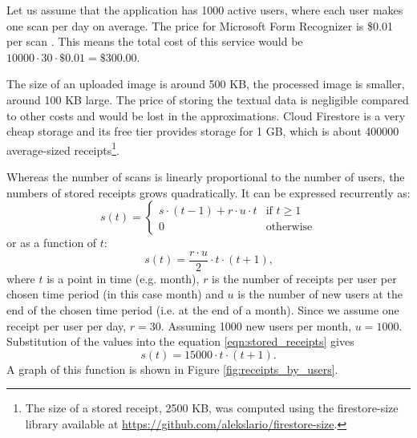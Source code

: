 \documentclass[
  digital, %
  table,   %
  oneside, %
  lof,     %
  lot,     %
]{fithesis3}
\begin{document}
Let us assume that the application has \num{1000} active users, where each user makes one scan per day on average.
The price for Microsoft Form Recognizer is \$0.01 per scan \cite{FormRecognizerPricing}. This means the total cost of this service would be $\num{10000} \cdot 30 \cdot \$0.01 = \$300.00$.

The size of an uploaded image is around 500 KB, the processed image is smaller, around 100 KB large. The price of storing the textual data is negligible compared to other costs and would be lost in the approximations. Cloud Firestore is a very cheap storage \cite{CloudFirestorePricing} and its free tier provides storage for 1 GB, which is about \num{400000} average-sized receipts\footnote{The size of a stored receipt, \num{2500} KB, was computed using the firestore-size library available at \url{https://github.com/alekslario/firestore-size}.}.

Whereas the number of scans is linearly proportional to the number of users, the numbers of stored receipts grows quadratically. It can be expressed recurrently as: 
\begin{equation}
    s(t) = \begin{cases}
        s \cdot (t-1) + r \cdot u \cdot t & \text{if }t\geq1\\
        0 & \text{otherwise}
    \end{cases}
\end{equation}
or as a function of $t$:
\begin{equation}
\label{eqn:stored_receipts}
s(t) = \frac{r \cdot u}{2} \cdot t \cdot (t + 1)\text{,}
\end{equation}
where $t$ is a point in time (e.g. month), $r$ is the number of receipts per user per chosen time period (in this case month) and $u$ is the number of new users at the end of the chosen time period (i.e. at the end of a month). Since we assume one receipt per user per day, $r = 30$. Assuming \num{1000} new users per month, $u = \num{1000}$. 
Substitution of the values into the equation \ref{eqn:stored_receipts} gives
\begin{equation}
s(t) = \num{15000} \cdot t \cdot (t + 1)\text{.}
\end{equation}
A graph of this function is shown in Figure \ref{fig:receipts_by_users}.
\end{document}
